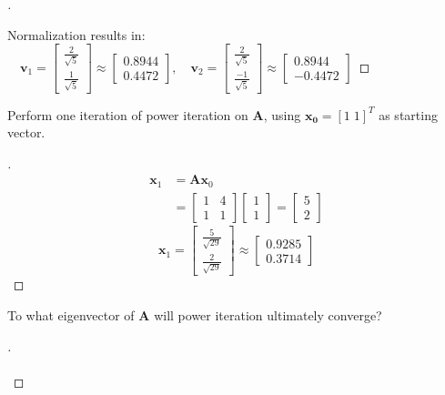 \documentclass[12pt]{article}
\newenvironment{exercise}[2][Exercise]{\begin{trivlist}
\item[\hskip \labelsep {\bfseries #1}\hskip \labelsep {\bfseries #2.}]}{\end{trivlist}}
\begin{document}
\begin{proof}[]
\begin{center}
	\end{center}
	Normalization results in:  $\quad \boxed{
		\bm{v}_1 = \begin{bmatrix} \frac{2}{\sqrt{5}} \\ \frac{1}{\sqrt{5}} \end{bmatrix}
			\approx \begin{bmatrix} 0.8944 \\ 0.4472 \end{bmatrix},
		\quad \bm{v}_2 = \begin{bmatrix} \frac{2}{\sqrt{5}} \\ \frac{-1}{\sqrt{5}} \end{bmatrix}
			\approx \begin{bmatrix} 0.8944 \\ -0.4472 \end{bmatrix}
	} $
\end{proof}
\begin{exercise}{5}
	Perform one iteration of power iteration on $\bm{A}$, using $\bm{x_0}=[1\;1]^T$ as starting vector.
\end{exercise}
\begin{proof}[]
	\vspace{-10mm}
	\begin{align*}
		\bm{x}_1 &= \bm{A} \bm{x}_0 \\
		&= \begin{bmatrix} 1 & 4 \\ 1 & 1 \end{bmatrix} \begin{bmatrix} 1 \\ 1 \end{bmatrix} = \begin{bmatrix} 5 \\ 2 \end{bmatrix}
	\end{align*}
	\[ \boxed{\bm{x}_1 = \begin{bmatrix} \frac{5}{\sqrt{29}} \\ \frac{2}{\sqrt{29}} \end{bmatrix} \approx  \begin{bmatrix} 0.9285 \\ 0.3714 \end{bmatrix}} \]
\end{proof}
\begin{exercise}{6}
	To what eigenvector of $\bm{A}$ will power iteration ultimately converge?
\end{exercise}
\begin{proof}[]
	\\	
	\vspace{-5mm}\\
\end{proof}
\end{document}
